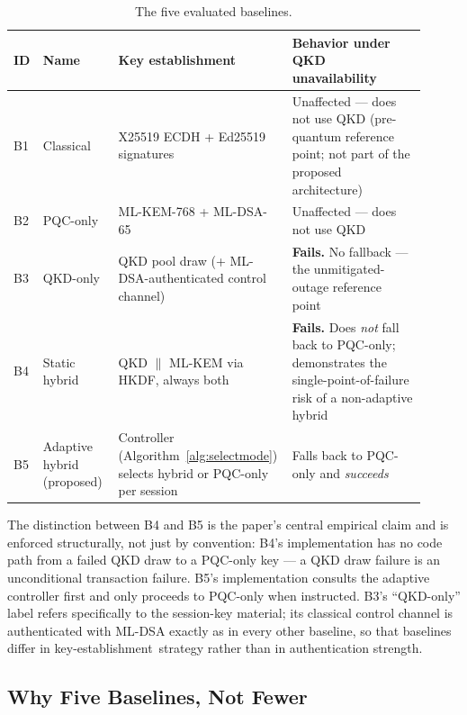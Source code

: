 \documentclass[journal]{IEEEtran}
\newcommand{\keyest}{key-establishment}
\begin{document}
\begin{table}[t]
\centering
\caption{The five evaluated baselines.}
\label{tab:baselines}
\small
\begin{tabular}{@{}p{0.05\linewidth}p{0.18\linewidth}p{0.36\linewidth}p{0.32\linewidth}@{}}
\toprule
ID & Name & Key establishment & Behavior under QKD unavailability \\
\midrule
B1 & Classical & X25519 ECDH + Ed25519 signatures & Unaffected --- does not use QKD (pre-quantum reference point; not part of the proposed architecture) \\
B2 & PQC-only & ML-KEM-768 + ML-DSA-65 & Unaffected --- does not use QKD \\
B3 & QKD-only & QKD pool draw (+ ML-DSA-authenticated control channel) & \textbf{Fails.} No fallback --- the unmitigated-outage reference point \\
B4 & Static hybrid & QKD $\|$ ML-KEM via HKDF, always both & \textbf{Fails.} Does \emph{not} fall back to PQC-only; demonstrates the single-point-of-failure risk of a non-adaptive hybrid \\
B5 & Adaptive hybrid (proposed) & Controller (Algorithm~\ref{alg:selectmode}) selects hybrid or PQC-only per session & Falls back to PQC-only and \emph{succeeds} \\
\bottomrule
\end{tabular}
\end{table}

The distinction between B4 and B5 is the paper's central empirical claim and is enforced structurally, not just by convention: B4's implementation has no code path from a failed QKD draw to a PQC-only key --- a QKD draw failure is an unconditional transaction failure. B5's implementation consults the adaptive controller first and only proceeds to PQC-only when instructed. B3's ``QKD-only'' label refers specifically to the session-key material; its classical control channel is authenticated with ML-DSA exactly as in every other baseline, so that baselines differ in \keyest\ strategy rather than in authentication strength.

\subsection{Why Five Baselines, Not Fewer}
\end{document}
